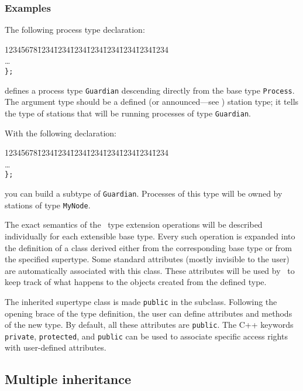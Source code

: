 \subsubsection*{Examples}

\noindent
The following process type declaration:
{\tt\begin{tabbing}
12345678\=1234\=1234\=1234\=1234\=1234\=1234\=1234\=1234\kill
{}\\
\> \>\ldots \\
\> {\tt \};}
\end{tabbing}}
\noindent
defines a process type {\tt Guardian} descending directly from the base type
{\tt Process}.
The argument type should be a defined (or announced---see )
station type;
it tells the type of stations that will be running processes of type
{\tt Guardian}.

With the following declaration:
{\tt\begin{tabbing}
12345678\=1234\=1234\=1234\=1234\=1234\=1234\=1234\=1234\kill
{}\\
\> \>\ldots \\
\> {\tt \};}
\end{tabbing}}
\noindent
you can build a subtype of {\tt Guardian}.
Processes of this type will be owned by stations of type {\tt MyNode}.

\medskip

\noindent
The exact semantics of the \smurph\ type extension operations
will be described individually for each extensible base type.
Every such operation is expanded into the definition of a class
derived either from the corresponding base type or from
the specified supertype.
Some standard attributes (mostly invisible to the user) are automatically
associated with this class.
These attributes will be used by \smurph\ to keep track of what happens
to the objects created from the defined type.

The inherited supertype class is made {\tt public} in the subclass.
Following the opening brace of the type definition, the user can define
attributes and methods of the new type.
By default, all these attributes are {\tt public}.
The C++ keywords
{\tt private}, {\tt protected}, and {\tt public} can be used to associate
specific access rights with user-defined attributes.

\subsection {Multiple inheritance}
\label{rm_st_mi}

